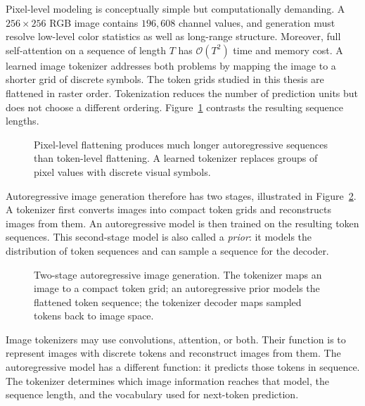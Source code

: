 Pixel-level modeling is conceptually simple but computationally demanding. A
$256\times256$ RGB image contains $196{,}608$ channel values, and generation
must resolve low-level color statistics as well as long-range structure.
Moreover, full self-attention on a sequence of length $T$ has
$\mathcal{O}(T^2)$ time and memory cost. A learned image tokenizer addresses
both problems by mapping the image to a shorter grid of discrete symbols. The
token grids studied in this thesis are flattened in raster order. Tokenization
reduces the number of prediction units but does not choose a different
ordering. Figure~\ref{fig:pixel_vs_token_sequence} contrasts the resulting
sequence lengths.

\begin{figure}[t]
    \centering
    \resizebox{0.94\textwidth}{!}{}
    \caption{Pixel-level flattening produces much longer autoregressive sequences than token-level flattening. A learned tokenizer replaces groups of pixel values with discrete visual symbols.}
    \label{fig:pixel_vs_token_sequence}
\end{figure}

Autoregressive image generation therefore has two stages, illustrated in
Figure~\ref{fig:two_stage_autoregressive_pipeline}. A tokenizer first converts
images into compact token grids and reconstructs images from them. An
autoregressive model is then trained on the resulting token sequences. This
second-stage model is also called a \emph{prior}: it models the distribution of
token sequences and can sample a sequence for the decoder.

\begin{figure}[t]
    \centering
    \resizebox{0.96\textwidth}{!}{}
    \caption{Two-stage autoregressive image generation. The tokenizer maps an image to a compact token grid; an autoregressive prior models the flattened token sequence; the tokenizer decoder maps sampled tokens back to image space.}
    \label{fig:two_stage_autoregressive_pipeline}
\end{figure}

Image tokenizers may use convolutions, attention, or both. Their function is to
represent images with discrete tokens and reconstruct images from them. The
autoregressive model has a different function: it predicts those tokens in
sequence. The tokenizer determines which image information reaches that model,
the sequence length, and the vocabulary used for next-token prediction.


